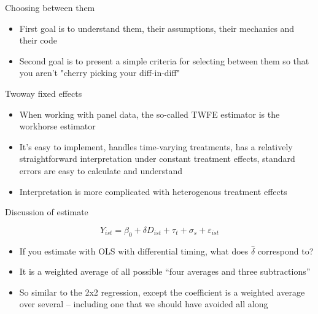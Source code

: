 \documentclass{beamer}
\begin{document}
\begin{frame}{Choosing between them}

\begin{itemize}
\item First goal is to understand them, their assumptions, their mechanics and their code
\item Second goal is to present a simple criteria for selecting between them so that you aren't "cherry picking your diff-in-diff"
\end{itemize}

\end{frame}




\begin{frame}{Twoway fixed effects}

\begin{itemize}
\item When working with panel data, the so-called TWFE estimator is the workhorse estimator
\item It's easy to implement, handles time-varying treatments, has a relatively straightforward interpretation under constant treatment effects, standard errors are easy to calculate and understand
\item Interpretation is more complicated with heterogenous treatment effects
\end{itemize}

\end{frame}




\begin{frame}{Discussion of estimate}


$$Y_{ist} = \beta_0 + \delta D_{ist} + \tau_t + \sigma_s + \varepsilon_{ist}$$


\begin{itemize}
\item If you estimate with OLS with differential timing, what does $\widehat{\delta}$ correspond to?
\item It is a weighted average of all possible ``four averages and three subtractions'' 
\item So similar to the 2x2 regression, except the coefficient is a weighted average over several -- including one that we should have avoided all along

\end{itemize}

\end{frame}
\end{document}
